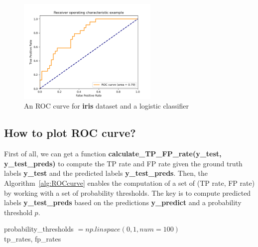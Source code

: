 \begin{figure}[!htbp]
    \centering
    \includegraphics[width=0.6\textwidth]{images/safetyIssues/ROC-iris.png}
    \caption{An ROC curve for \textbf{iris} dataset and a logistic classifier}
    \label{fig:ROC-iris}
\end{figure}

\subsection*{How to plot ROC curve?}

First of all, we can get a function \textbf{calculate\_TP\_FP\_rate(y\_test, y\_test\_preds)} to compute the TP rate and FP rate given the ground truth labels \textbf{y\_test} and the predicted labels \textbf{y\_test\_preds}. Then, the Algorithm~\ref{alg:ROCcurve} enables the computation of a set of (TP rate, FP rate) by working with a set of probability thresholds. The key is to compute predicted labels \textbf{y\_test\_preds} based on the predictions \textbf{y\_predict} and a probability threshold $p$. 

\begin{algorithm}[!htbp]
\SetAlgoLined
probability\_thresholds $= np.linspace(0,1,num=100)$ \\
\Return tp\_rates, fp\_rates
 \caption{$\functionname{ROC-curve}$(y\_test,y\_predict), where y\_test is the vector of ground truth label, and y\_predict is the vector of predictions}
 \label{alg:ROCcurve}
\end{algorithm}



